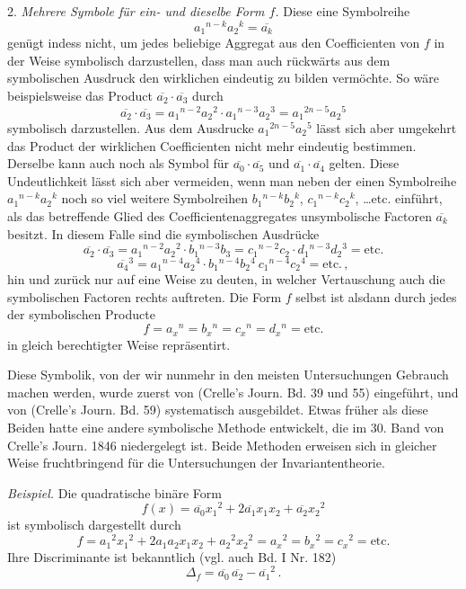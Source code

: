 2. \textit{Mehrere Symbole für ein- und dieselbe Form $f$.} Diese eine Symbolreihe
\[
a_1{}^{n-k}a_2{}^k = \overline{a_k}
\]
genügt indess nicht, um jedes beliebige Aggregat aus den Coefficienten von $f$ in der Weise symbolisch darzustellen, dass man auch rückwärts aus dem symbolischen Ausdruck den wirklichen eindeutig zu bilden vermöchte. So wäre beispielsweise das Product $\overline{a_2}\cdot\overline{a_3}$ durch
\[
\overline{a_2}\cdot\overline{a_3} = a_1{}^{n-2}a_2{}^2\cdot a_1{}^{n-3}a_2{}^3 = a_1{}^{2n-5}a_2{}^5
\]
symbolisch darzustellen. Aus dem Ausdrucke $a_1{}^{2n-5}a_2{}^5$ lässt sich aber umgekehrt das Product der wirklichen Coefficienten nicht mehr eindeutig bestimmen. Derselbe kann auch noch als Symbol für $\overline{a_0}\cdot\overline{a_5}$ und $\overline{a_1}\cdot\overline{a_4}$ gelten. Diese Undeutlichkeit lässt sich aber vermeiden, wenn man neben der einen Symbolreihe $a_1{}^{n-k}a_2{}^k$ noch so viel weitere Symbolreihen $b_1{}^{n-k}b_2{}^k$, $c_1{}^{n-k}c_2{}^k$, \ldots etc. einführt, als das betreffende Glied des Coefficientenaggregates unsymbolische Factoren $\overline{a_k}$ besitzt. In diesem Falle sind die symbolischen Ausdrücke
\[
\overline{a_2}\cdot\overline{a_3} = a_1{}^{n-2}a_2{}^2\cdot b_1{}^{n-3}b_3 = c_1{}^{n-2}c_2\cdot d_1{}^{n-3}d_2{}^3 = \text{etc.}
\]
\[
\overline{a_4}{}^3 = a_1{}^{n-4}a_2{}^4\cdot b_1{}^{n-4}b_2{}^4\ c_1{}^{n-4}c_2{}^4 = \text{etc.}\,, %
\]
hin und zurück nur auf eine Weise zu deuten, in welcher Vertauschung auch die symbolischen Factoren rechts auftreten. Die Form $f$ selbst ist alsdann durch jedes der symbolischen Producte
\[
f = a_x{}^n = b_x{}^n = c_x{}^n = d_x{}^n = \text{etc.}
\]
in gleich berechtigter Weise repräsentirt.

Diese Symbolik, von der wir nunmehr in den meisten Untersuchungen Gebrauch machen werden, wurde zuerst von  (Crelle's Journ. Bd. 39 und 55) eingeführt, und von  (Crelle's Journ. Bd. 59) systematisch ausgebildet. Etwas früher als diese Beiden hatte  eine andere symbolische Methode entwickelt, die im 30. Band von Crelle's Journ. 1846 niedergelegt ist. Beide Methoden erweisen sich in gleicher Weise fruchtbringend für die Untersuchungen der Invariantentheorie.

\textit{Beispiel.} Die quadratische binäre Form
\[
f(x) = \overline{a_0}x_1{}^2 + 2\overline{a_1}x_1x_2 + \overline{a_2}x_2{}^2
\]
ist symbolisch dargestellt durch
\[
f = a_1{}^2x_1{}^2 + 2a_1a_2x_1x_2 + a_2{}^2x_2{}^2 = a_x{}^2 = b_x{}^2 = c_x{}^2 = \text{etc.}
\]
Ihre Discriminante ist bekanntlich (vgl. auch Bd. I Nr. 182)
\[
\Delta_f = \overline{a_0}\,\overline{a_2} - \overline{a_1}{}^2\,.
\]


